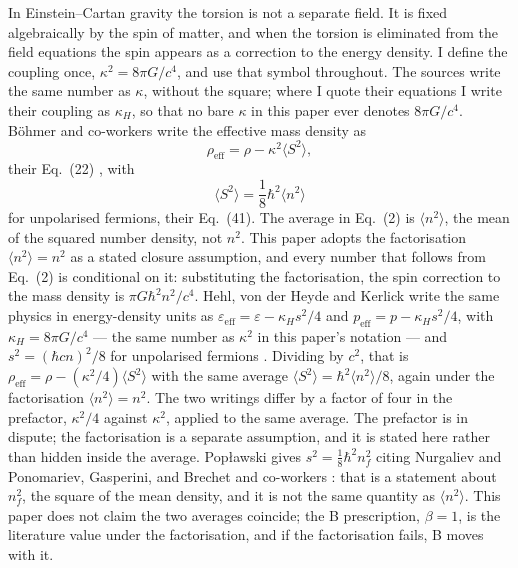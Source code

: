 \documentclass[11pt]{article}
\begin{document}
In Einstein--Cartan gravity \cite{Cartan22,Hehl76} the torsion is not a
separate field. It is fixed algebraically by the spin of matter, and when
the torsion is eliminated from the field equations the spin appears as a
correction to the energy density. I define the coupling once,
$\kappa^2 = 8\pi G/c^4$, and use that symbol throughout. The sources
write the same number as $\kappa$, without the square; where I quote
their equations I write their coupling as $\kappa_H$, so that no bare
$\kappa$ in this paper ever denotes $8\pi G/c^4$.
B\"ohmer and co-workers write the effective mass density as
\begin{equation}
\rho_{\mathrm{eff}} = \rho - \kappa^2\langle S^2\rangle,
\end{equation}
their Eq.~(22) \cite{Bohmer18}, with
\begin{equation}
\langle S^2\rangle = \frac18\hbar^2\langle n^2\rangle
\end{equation}
for unpolarised fermions, their Eq.~(41). The average in Eq.~(2) is
$\langle n^2\rangle$, the mean of the squared number density, not
$n^2$. This paper adopts the factorisation $\langle n^2\rangle = n^2$
as a stated closure assumption, and every number that follows from
Eq.~(2) is conditional on it: substituting the factorisation, the spin
correction to the mass density is $\pi G\hbar^2 n^2/c^4$. Hehl, von der
Heyde and Kerlick write the same physics in energy-density units as
$\varepsilon_{\mathrm{eff}} = \varepsilon - \kappa_H s^2/4$ and
$p_{\mathrm{eff}} = p - \kappa_H s^2/4$, with $\kappa_H = 8\pi G/c^4$
--- the same number as $\kappa^2$ in this paper's notation --- and
$s^2 = (\hbar c n)^2/8$ for unpolarised
fermions \cite{Hehl76,Poplawski10}. Dividing by $c^2$, that is
$\rho_{\mathrm{eff}} = \rho - (\kappa^2/4)\langle S^2\rangle$ with the
same average $\langle S^2\rangle = \hbar^2\langle n^2\rangle/8$,
again under the factorisation $\langle n^2\rangle = n^2$. The two
writings differ by a factor of four in the prefactor, $\kappa^2/4$
against $\kappa^2$, applied to the same average. The prefactor is in
dispute; the factorisation is a separate assumption, and it is stated
here rather than hidden inside the average. Pop{\l}awski gives
$s^2 = \tfrac18\hbar^2 n_f^2$ citing Nurgaliev and Ponomariev,
Gasperini, and Brechet and co-workers
\cite{Poplawski10,Poplawski16,Gasperini86,Nurgaliev83}: that is a
statement about $n_f^2$, the square of the mean density, and it is not
the same quantity as $\langle n^2\rangle$. This paper does not claim
the two averages coincide; the B prescription, $\beta = 1$, is the
literature value under the factorisation, and if the factorisation
fails, B moves with it.
\end{document}
